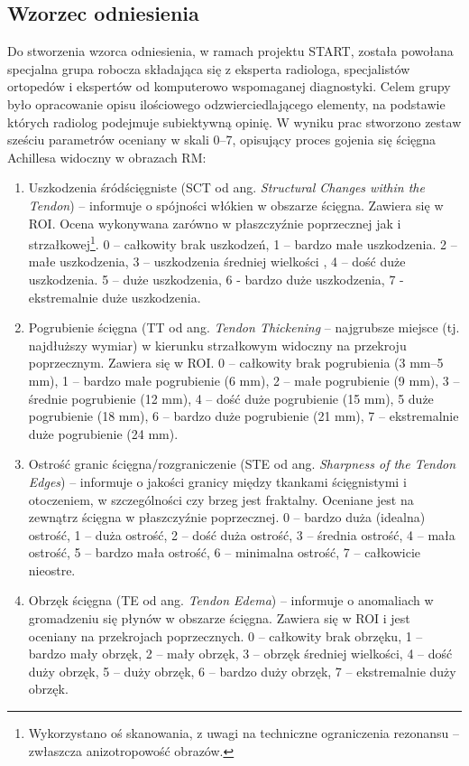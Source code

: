 \subsection{Wzorzec odniesienia}
\label{seq:ground-truth}
Do stworzenia wzorca odniesienia, w ramach projektu START, została powołana specjalna grupa robocza składająca się z eksperta radiologa, specjalistów ortopedów i ekspertów od komputerowo wspomaganej diagnostyki. Celem grupy było opracowanie opisu ilościowego odzwierciedlającego elementy, na podstawie których radiolog podejmuje subiektywną opinię. W wyniku prac stworzono zestaw sześciu parametrów oceniany w skali 0--7, opisujący proces gojenia się ścięgna Achillesa widoczny w obrazach RM:

\begin{enumerate}
	\item Uszkodzenia śródścięgniste (SCT od ang. \textit{Structural Changes within the Tendon}) -- informuje o spójności włókien w obszarze ścięgna. Zawiera się w ROI. Ocena wykonywana zarówno w płaszczyźnie poprzecznej jak i strzałkowej\footnote{Wykorzystano oś skanowania, z uwagi na techniczne ograniczenia rezonansu -- zwłaszcza anizotropowość obrazów.}. 0 – całkowity brak uszkodzeń, 1 – bardzo małe uszkodzenia. 2 – małe uszkodzenia, 3 – uszkodzenia średniej wielkości , 4 – dość duże uszkodzenia. 5 – duże uszkodzenia, 6 - bardzo duże uszkodzenia, 7 - ekstremalnie duże uszkodzenia.
	\item Pogrubienie ścięgna (TT od ang. \textit{Tendon Thickening} -- najgrubsze miejsce (tj. najdłuższy wymiar) w kierunku strzałkowym widoczny na przekroju poprzecznym. Zawiera się w ROI. 0 – całkowity brak pogrubienia (3 mm--5 mm), 1 – bardzo małe pogrubienie (6 mm), 2 – małe pogrubienie (9 mm), 3 – średnie pogrubienie (12 mm), 4 –  dość duże pogrubienie (15 mm), 5 duże pogrubienie (18 mm), 6 – bardzo duże pogrubienie (21 mm), 7 – ekstremalnie duże pogrubienie (24 mm).
	\item Ostrość granic ścięgna/rozgraniczenie (STE od ang. \textit{Sharpness of the Tendon Edges}) -- informuje o jakości granicy między tkankami ścięgnistymi i otoczeniem, w szczególności czy brzeg jest fraktalny. Oceniane jest na zewnątrz ścięgna w płaszczyźnie poprzecznej. 0 – bardzo duża (idealna) ostrość, 1 – duża ostrość, 2 – dość duża ostrość, 3 – średnia ostrość, 4 – mała ostrość, 5 – bardzo mała ostrość, 6 – minimalna ostrość, 7 – całkowicie nieostre.
	\item Obrzęk ścięgna (TE od ang. \textit{Tendon Edema}) -- informuje o anomaliach \linebreak w gromadzeniu się płynów w obszarze ścięgna. Zawiera się w ROI i jest oceniany na przekrojach poprzecznych. 0 – całkowity brak obrzęku, 1 – bardzo mały obrzęk, 2 – mały obrzęk, 3 – obrzęk średniej wielkości, 4 – dość duży obrzęk, 5 – duży obrzęk, 6 – bardzo duży obrzęk, 7 -- ekstremalnie duży obrzęk.

\end{enumerate}

